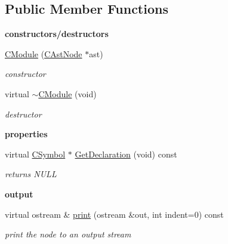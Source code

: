 \subsection*{Public Member Functions}
\begin{Indent}{\bf constructors/destructors}\par
\begin{DoxyCompactItemize}
\item 
\hyperlink{classCModule_aa43c626f59f792272258e47aa261df86}{C\-Module} (\hyperlink{classCAstNode}{C\-Ast\-Node} $\ast$ast)
\begin{DoxyCompactList}\small\item\em constructor \end{DoxyCompactList}\item 
\hypertarget{classCModule_ad787b91a190b98bf6db9ae7c72c926a6}{virtual \hyperlink{classCModule_ad787b91a190b98bf6db9ae7c72c926a6}{$\sim$\-C\-Module} (void)}\label{classCModule_ad787b91a190b98bf6db9ae7c72c926a6}

\begin{DoxyCompactList}\small\item\em destructor \end{DoxyCompactList}\end{DoxyCompactItemize}
\end{Indent}
\begin{Indent}{\bf properties}\par
\begin{DoxyCompactItemize}
\item 
\hypertarget{classCModule_adb70259cf1f2e832a5c8d660667a0dfc}{virtual \hyperlink{classCSymbol}{C\-Symbol} $\ast$ \hyperlink{classCModule_adb70259cf1f2e832a5c8d660667a0dfc}{Get\-Declaration} (void) const }\label{classCModule_adb70259cf1f2e832a5c8d660667a0dfc}

\begin{DoxyCompactList}\small\item\em returns N\-U\-L\-L \end{DoxyCompactList}\end{DoxyCompactItemize}
\end{Indent}
\begin{Indent}{\bf output}\par
\begin{DoxyCompactItemize}
\item 
virtual ostream \& \hyperlink{classCModule_a0fba03ebdf11ef9493b54e452a1afe62}{print} (ostream \&out, int indent=0) const 
\begin{DoxyCompactList}\small\item\em print the node to an output stream \end{DoxyCompactList}\end{DoxyCompactItemize}
\end{Indent}
